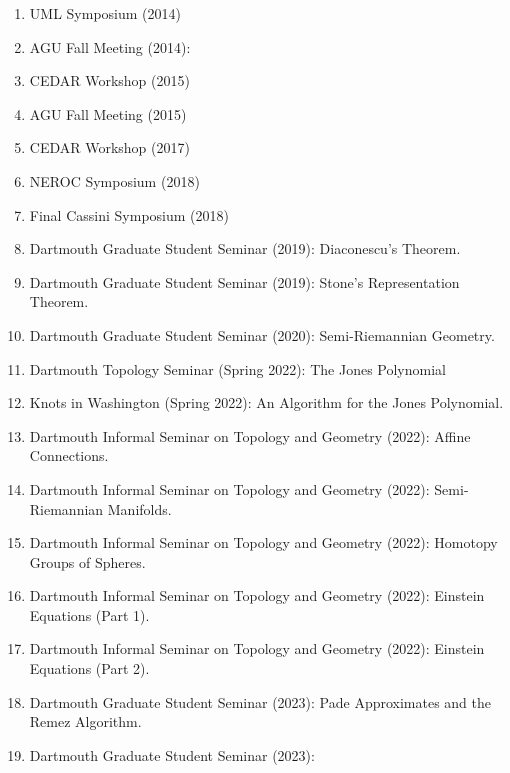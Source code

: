 \documentclass[a4paper,sans]{moderncv}
\begin{document}
        \begin{enumerate}
            \item UML Symposium (2014)
            \item AGU Fall Meeting (2014):
            \item CEDAR Workshop (2015)
            \item AGU Fall Meeting (2015)
            \item CEDAR Workshop (2017)
            \item NEROC Symposium (2018)
            \item Final Cassini Symposium (2018)
            \item
                Dartmouth Graduate Student Seminar (2019):
                Diaconescu's Theorem.
            \item
                Dartmouth Graduate Student Seminar (2019):
                Stone's Representation Theorem.
            \item
                Dartmouth Graduate Student Seminar (2020):
                Semi-Riemannian Geometry.
            \item
                Dartmouth Topology Seminar (Spring 2022):
                The Jones Polynomial
            \item
                Knots in Washington (Spring 2022):
                An Algorithm for the Jones Polynomial.
            \item
                Dartmouth Informal Seminar on Topology and Geometry (2022):
                Affine Connections.
            \item
                Dartmouth Informal Seminar on Topology and Geometry (2022):
                Semi-Riemannian Manifolds.
            \item
                Dartmouth Informal Seminar on Topology and Geometry (2022):
                Homotopy Groups of Spheres.
            \item
                Dartmouth Informal Seminar on Topology and Geometry (2022):
                Einstein Equations (Part 1).
            \item
                Dartmouth Informal Seminar on Topology and Geometry (2022):
                Einstein Equations (Part 2).
            \item
                Dartmouth Graduate Student Seminar (2023):
                Pade Approximates and the Remez Algorithm.
            \item
                Dartmouth Graduate Student Seminar (2023):

\end{enumerate}
\end{document}
